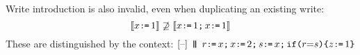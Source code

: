
Write introduction is also invalid, even when duplicating an existing write:
\begin{displaymath}
  \llbracket x \texttt{:}\mkern-1mu\texttt{=}\, 1\rrbracket 
  \not\supseteq
  \llbracket x \texttt{:}\mkern-1mu\texttt{=}\, 1 \texttt{;}\,\allowbreak x \texttt{:}\mkern-1mu\texttt{=}\, 1\rrbracket
\end{displaymath}
These are distinguished by the context:
\begin{math}
  \hole{} \PAR
  r\GETS x \SEMI
  x\GETS2 \SEMI
  s\GETS x\SEMI
  \IF{\aReg {=} \bReg} \THEN \cLoc \GETS 1 \FI
\end{math}












